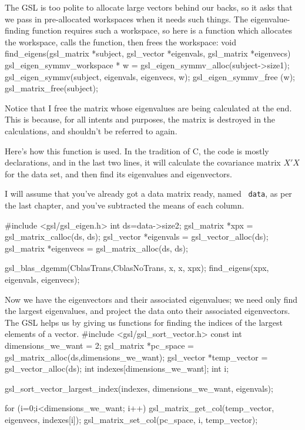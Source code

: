 The GSL is too polite to allocate large vectors behind our backs, so
it asks that we pass in pre-allocated workspaces when it needs such
things. The eigenvalue-finding function requires such a workspace, so
here is a function which allocates the workspace, calls the function,
then frees the workspace:
void find_eigens(gsl_matrix *subject, gsl_vector *eigenvals, 
                            gsl_matrix *eigenvecs){
   gsl_eigen_symmv_workspace * w 
                        = gsl_eigen_symmv_alloc(subject->size1);
   gsl_eigen_symmv(subject, eigenvals, eigenvecs, w);
   gsl_eigen_symmv_free (w);
   gsl_matrix_free(subject);
}

Notice that I free the matrix whose eigenvalues are being calculated at the end.
This is because, for all intents and purposes, the matrix is destroyed in the
calculations, and shouldn't be referred to again. 

Here's how this function is used. In the tradition of C, the code is
mostly declarations, and in the last two lines, it will calculate the
covariance matrix $X'X$ for the data set, and then find its eigenvalues
and eigenvectors.

I will assume that you've already got a data matrix ready, named {\tt
data}, as per the last chapter, and you've subtracted the means of each
column.

#include <gsl/gsl_eigen.h>
int ds=data->size2;
gsl_matrix *xpx  = gsl_matrix_calloc(ds, ds);
gsl_vector *eigenvals   = gsl_vector_alloc(ds);
gsl_matrix *eigenvecs   = gsl_matrix_alloc(ds, ds);

gsl_blas_dgemm(CblasTrans,CblasNoTrans, x, x, xpx);
find_eigens(xpx, eigenvals, eigenvecs);

Now we have the eigenvectors and their associated eigenvalues; we need only find
the largest eigenvalues, and project the data onto their associated eigenvectors.
The GSL helps us by giving us functions for
finding the indices of the largest elements of a vector.
#include <gsl/gsl_sort_vector.h>
const int dimensions_we_want = 2;
gsl_matrix *pc_space 
               = gsl_matrix_alloc(ds,dimensions_we_want);
gsl_vector *temp_vector = gsl_vector_alloc(ds);
int indexes[dimensions_we_want];
int i;

gsl_sort_vector_largest_index(indexes, dimensions_we_want, eigenvals);

for (i=0;i<dimensions_we_want; i++){
   gsl_matrix_get_col(temp_vector, eigenvecs, indexes[i]);
   gsl_matrix_set_col(pc_space, i, temp_vector);
}

